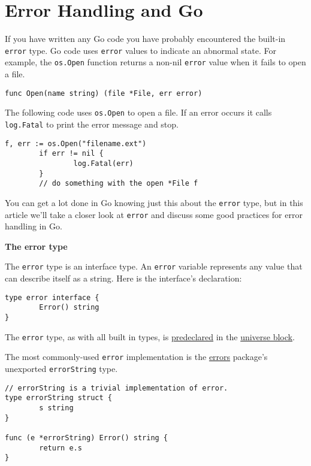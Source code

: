 \cleardoublepage
{}
{}
\chapter*{Error Handling and Go}

If you have written any Go code you have probably encountered the
built-in \texttt{error} type. Go code uses \texttt{error} values to
indicate an abnormal state. For example, the \texttt{os.Open} function
returns a non-nil \texttt{error} value when it fails to open a file.

\begin{Verbatim}[frame=single]
func Open(name string) (file *File, err error)
\end{Verbatim}

The following code uses \texttt{os.Open} to open a file. If an error
occurs it calls \texttt{log.Fatal} to print the error message and stop.

\begin{Verbatim}[frame=single]
        f, err := os.Open("filename.ext")
        if err != nil {
                log.Fatal(err)
        }
        // do something with the open *File f
\end{Verbatim}

You can get a lot done in Go knowing just this about the \texttt{error}
type, but in this article we'll take a closer look at \texttt{error} and
discuss some good practices for error handling in Go.

\textbf{The error type}

The \texttt{error} type is an interface type. An \texttt{error} variable
represents any value that can describe itself as a string. Here is the
interface's declaration:

\begin{Verbatim}[frame=single]
type error interface {
        Error() string
}
\end{Verbatim}

The \texttt{error} type, as with all built in types, is
\href{http://golang.org/doc/go\_spec.html\#Predeclared\_identifiers}{predeclared} in the
\href{http://golang.org/doc/go\_spec.html\#Blocks}{universe block}.

The most commonly-used \texttt{error} implementation is the
\href{http://golang.org/pkg/errors/}{errors} package's unexported \texttt{errorString}
type.

\begin{Verbatim}[frame=single]
// errorString is a trivial implementation of error.
type errorString struct {
        s string
}

func (e *errorString) Error() string {
        return e.s
}
\end{Verbatim}

